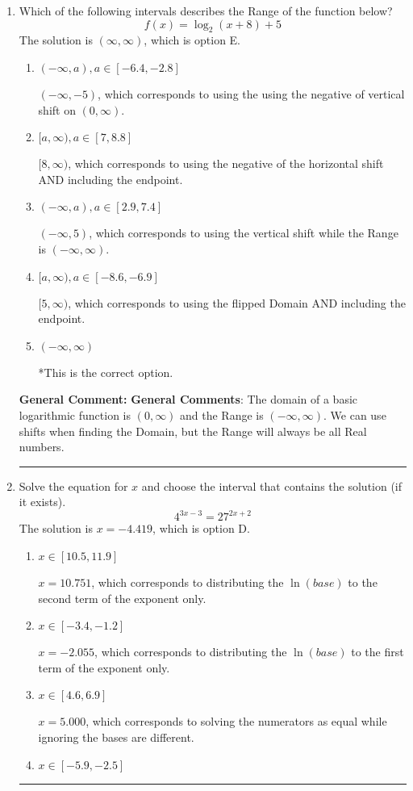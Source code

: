\documentclass{extbook}[14pt]
\newcommand{\litem}[1]{\item #1

\rule{\textwidth}{0.4pt}}
\begin{document}
\begin{enumerate}\litem{
Which of the following intervals describes the Range of the function below?
\[ f(x) = \log_2{(x+8)}+5 \]The solution is \( (\infty, \infty) \), which is option E.\begin{enumerate}[label=\Alph*.]
\item \( (-\infty, a), a \in [-6.4, -2.8] \)

$(-\infty, -5)$, which corresponds to using the using the negative of vertical shift on $(0, \infty)$.
\item \( [a, \infty), a \in [7, 8.8] \)

$[8, \infty)$, which corresponds to using the negative of the horizontal shift AND including the endpoint.
\item \( (-\infty, a), a \in [2.9, 7.4] \)

$(-\infty, 5)$, which corresponds to using the vertical shift while the Range is $(-\infty, \infty)$.
\item \( [a, \infty), a \in [-8.6, -6.9] \)

$[5, \infty)$, which corresponds to using the flipped Domain AND including the endpoint.
\item \( (-\infty, \infty) \)

*This is the correct option.
\end{enumerate}

\textbf{General Comment:} \textbf{General Comments}: The domain of a basic logarithmic function is $(0, \infty)$ and the Range is $(-\infty, \infty)$. We can use shifts when finding the Domain, but the Range will always be all Real numbers.
}
\litem{
Solve the equation for $x$ and choose the interval that contains the solution (if it exists).
\[ 4^{3x-3} = 27^{2x+2} \]The solution is \( x = -4.419 \), which is option D.\begin{enumerate}[label=\Alph*.]
\item \( x \in [10.5, 11.9] \)

$x = 10.751$, which corresponds to distributing the $\ln(base)$ to the second term of the exponent only.
\item \( x \in [-3.4, -1.2] \)

$x = -2.055$, which corresponds to distributing the $\ln(base)$ to the first term of the exponent only.
\item \( x \in [4.6, 6.9] \)

$x = 5.000$, which corresponds to solving the numerators as equal while ignoring the bases are different.
\item \( x \in [-5.9, -2.5] \)


\end{enumerate}}
\end{enumerate}
\end{document}

